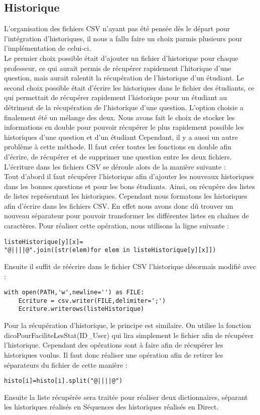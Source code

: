 \documentclass[a4paper, 12pt]{article}
\begin{document}
\subsection{Historique}
L'organisation des fichiers CSV n'ayant pas été pensée dès le départ pour l'intégration d'historiques, il nous a fallu faire un choix parmis plusieurs pour l'implémentation de celui-ci. \\
Le premier choix possible était d'ajouter un fichier d'historique pour chaque professeur, ce qui aurait permis de récupérer rapidement l'hitorique d'une question, mais aurait ralentit la récupération de l'historique d'un étudiant.
Le second choix possible était d'écrire les historiques dans le fichier des étudiants, ce qui permettait de récupérer rapidement l'historique pour un étudiant au détriment de la récupération de l'historique d'une question.
L'option choisie a finalement été un mélange des deux. Nous avons fait le choix de stocker les informations en double pour pouvoir récupérer le plus rapidement possible les historiques d'une question et d'un étudiant
Cependant, il y a aussi un autre problème à cette méthode. Il faut créer toutes les fonctions en double afin d'écrire, de récupérer et de supprimer une question entre les deux fichiers. L'écriture dans les fichiers CSV se déroule alors de la manière suivante :\\
Tout d'abord il faut récupérer l'historique afin d'ajouter les nouveaux historiques dans les bonnes questions et pour les bons étudiants. Ainsi, on récupère des listes de listes représentant les historiques. Cependant nous formatons les historiques afin d'écrire dans les fichiers CSV. En effet nous avons donc dû trouver un nouveau séparateur pour pouvoir transformer les différentes listes en chaînes de caractères. Pour réaliser cette opération, nous utilisons la ligne suivante :
\begin{lstlisting}
listeHistorique[y][x]= 
"@||||@".join([str(elem)for elem in listeHistorique[y][x]])
\end{lstlisting}
 Ensuite il suffit de réécrire dans le fichier CSV l'historique désormais modifié avec :
 \begin{lstlisting}
with open(PATH,'w',newline='') as FILE:
    Ecriture = csv.writer(FILE,delimiter=';')
    Ecriture.writerows(listeHistorique)
 \end{lstlisting}
Pour la récupération d'historique, le principe est similaire. On utilise la fonction dicoPourFaciliteLesStat(ID\_User) qui lira simplement le fichier afin de récupérer l'historique. Cependant des opérations sont à faire afin de récupérer les historiques voulus. Il faut donc réaliser une opération afin de retirer les séparateurs du fichier de cette manière :
\begin{lstlisting}
histo[i]=histo[i].split("@||||@")
\end{lstlisting}
Ensuite la liste récupérée sera traitée pour réaliser deux dictionnaires, séparant les historiques réalisés en Séquences des historiques réalisés en Direct. 
\end{document}
